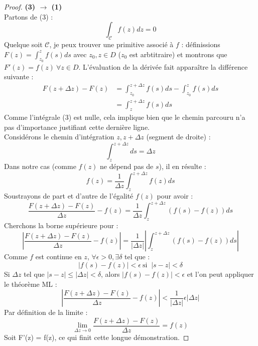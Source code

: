\begin{proof}
	\textbf{(3) $\rightarrow$ (1)}\\
	Partons de (3) :
	\begin{equation}
		\int_\mathcal{C} f(z) dz = 0
	\end{equation}
	Quelque soit $\mathcal{C}$, je peux trouver une primitive associé à $f$ : 
	définissions $F(z) = \int_{z_0}^{z} f(s) ds$ avec $z_0,z \in D$ ($z_0$ est 
	arbtitraire) et montrons que  $F'(z) = f(z)\ \forall z \in D$. L'évaluation de la
	dérivée fait apparaître la différence suivante :
	\begin{equation}
		\begin{array}{ll}
			F(z+\Delta z) - F(z) & = \int_{z_0}^{z+\Delta z} f(s) ds - \int_{z_0}^z f(s)ds \\
			                     & = \int_{z}^{z+\Delta z} f(s) ds                         
		\end{array}
	\end{equation}
	Comme l'intégrale (3) est nulle, cela implique bien que le chemin parcouru n'a pas
	d'importance justifiant cette dernière ligne.\\
	Considérons le chemin d'intégration $z,z+\Delta z$ (segment de droite) :
	\begin{equation}
		\int_z^{z+\Delta z} ds = \Delta z
	\end{equation}
	Dans notre cas (comme $f(z)$ ne dépend pas de $s$), il en résulte :
	\begin{equation}
		f(z) = \frac{1}{\Delta z} \int_z^{z+\Delta z} f(z) ds
	\end{equation}
	Soustrayons de part et d'autre de l'égalité $f(z)$ pour avoir :
	\begin{equation}
		\dfrac{F(z+\Delta z) - F(z)}{\Delta z} - f(z) = \dfrac{1}{\Delta z}\int_z^{z+
			\Delta z} (f(s)-f(z)) ds
	\end{equation}
	Cherchons la borne supérieure pour :
	\begin{equation}
		\left|\dfrac{F(z+\Delta z) - F(z)}{\Delta z} - f(z)\right| = \dfrac{1}{|\Delta z|}
		|\int_z^{z+ \Delta z} (f(s)-f(z)) ds|
	\end{equation}
	Comme $f$ est continue en $z$, $\forall \epsilon > 0, \exists \delta$ tel que :
	\begin{equation}
		|f(s)-f(z)|<\epsilon\ \text{si }\ |s-z| < \delta
	\end{equation}
	Si $\Delta z$ tel que $|s-z|\leq |\Delta z | < \delta$, alors $|f(s)-f(z)|<\epsilon$
	et l'on peut appliquer le théorème ML :
	\begin{equation}
		\left|\dfrac{F(z+\Delta z) - F(z)}{\Delta z} - f(z)\right| < \dfrac{1}{|\Delta z|}
		\epsilon|\Delta z|
	\end{equation}
	Par définition de la limite :
	\begin{equation}
		\lim\limits_{\Delta z \rightarrow 0} \dfrac{F(z+\Delta z) - F(z)}{\Delta z} = f(z)
	\end{equation}
	Soit F'(z) = f(z), ce qui finit cette longue démonstration.
\end{proof}
